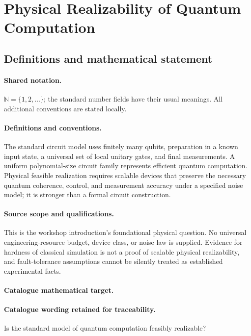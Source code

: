 \documentclass[11pt]{article}
\begin{document}
\section{Physical Realizability of Quantum Computation}\label{statement}

\subsection{Definitions and mathematical statement}

\paragraph{Shared notation.}$\mathbb N=\{1,2,\ldots\}$; the standard number fields have their usual meanings. All additional conventions are stated locally.


\paragraph{Definitions and conventions.} The standard circuit model uses finitely many qubits, preparation in a known input state, a universal set of local unitary gates, and final measurements. A uniform polynomial-size circuit family represents efficient quantum computation. Physical feasible realization requires scalable devices that preserve the necessary quantum coherence, control, and measurement accuracy under a specified noise model; it is stronger than a formal circuit construction.

\paragraph{Source scope and qualifications.} This is the workshop introduction's foundational physical question. No universal engineering-resource budget, device class, or noise law is supplied. Evidence for hardness of classical simulation is not a proof of scalable physical realizability, and fault-tolerance assumptions cannot be silently treated as established experimental facts.

\paragraph{Catalogue mathematical target.}
\paragraph{Catalogue wording retained for traceability.}
Is the standard model of quantum computation feasibly realizable?
\end{document}
